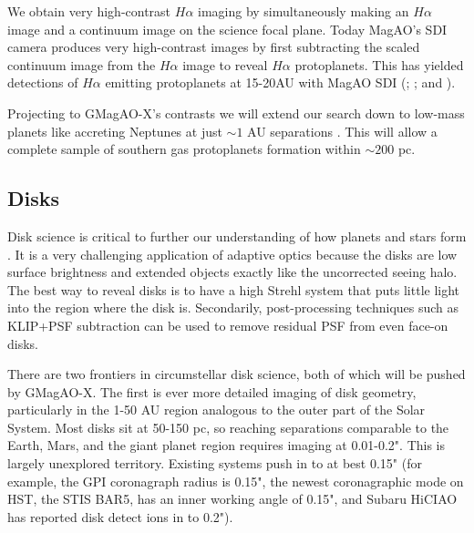\documentclass[12pt,preprint]{aastex}
\begin{document}
We obtain very high-contrast $H\alpha$ imaging by simultaneously making an $H\alpha$ image and a continuum image on the science focal plane. Today MagAO's SDI camera produces very high-contrast images by first subtracting the scaled continuum image from the $H\alpha$ image to reveal $H\alpha$ protoplanets. This has yielded detections of $H\alpha$ emitting protoplanets at 15-20AU with MagAO SDI  (\citet[HD142527 B,][]{2014ApJ...781L..30C}; \citet[LkCa 15 b,][]{2015Natur.527..342S}; and \citet[PDS 70 b,][]{2018ApJ...863L...8W}). 

Projecting to  GMagAO-X's contrasts we will extend our search down to low-mass planets like accreting Neptunes at just $\sim1$ AU separations \citep{2019BAAS...51c.527S}. This will allow a complete sample of southern gas protoplanets formation within $\sim200$ pc. 







\subsection{ Disks }
Disk science is critical to further our understanding of how planets and stars form \citep[see Astro2020 science white papers:][]{2019BAAS...51c.346J, 2019BAAS...51c.445W, 2019BAAS...51c.566D}.
It is a very challenging application of adaptive optics because
the disks are low surface brightness and extended objects exactly like the
uncorrected seeing halo. The best way to reveal disks is to have a high Strehl
system that puts little light into the region where the disk is. Secondarily,
post-processing techniques such as KLIP+PSF subtraction can be used to remove
residual PSF from even face-on disks.

There are two frontiers in circumstellar disk science, both of which will be
pushed by GMagAO-X. The first is ever more detailed imaging of disk geometry,
particularly in the 1-50 AU region analogous to the outer part of the Solar
System. Most disks sit at 50-150 pc, so reaching separations comparable to the Earth, Mars, and the giant
planet region requires imaging at 0.01-0.2". This is largely unexplored
territory. Existing systems push in to at best 0.15" (for example, the GPI
coronagraph radius is 0.15", the newest coronagraphic mode on HST, the STIS
BAR5, has an inner working angle of 0.15", and Subaru HiCIAO has reported disk
detect ions in to 0.2").  
\end{document}
